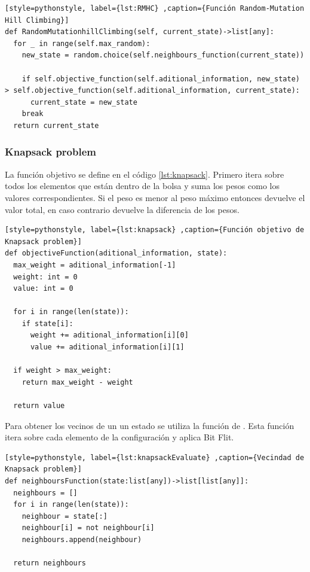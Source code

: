 \documentclass[12pt,twoside]{article}
\begin{document}
\begin{lstlisting}[style=pythonstyle, label={lst:RMHC} ,caption={Función Random-Mutation Hill Climbing}]
def RandomMutationhillClimbing(self, current_state)->list[any]:       
  for _ in range(self.max_random):
    new_state = random.choice(self.neighbours_function(current_state))

    if self.objective_function(self.aditional_information, new_state) > self.objective_function(self.aditional_information, current_state):
      current_state = new_state
    break
  return current_state
\end{lstlisting}

\clearpage
\subsubsection{Knapsack problem}

La función objetivo se define en el código \ref{lst:knapsack}. Primero itera sobre todos los elementos que están dentro de la bolsa y suma los pesos como los valores correspondientes. Si el peso es menor al peso máximo entonces devuelve el valor total, en caso contrario devuelve la diferencia de los pesos.

\begin{lstlisting}[style=pythonstyle, label={lst:knapsack} ,caption={Función objetivo de Knapsack problem}]
def objectiveFunction(aditional_information, state):
  max_weight = aditional_information[-1]
  weight: int = 0
  value: int = 0

  for i in range(len(state)):
    if state[i]:
      weight += aditional_information[i][0]
      value += aditional_information[i][1]

  if weight > max_weight:
    return max_weight - weight
    
  return value
\end{lstlisting}

Para obtener los vecinos de un un estado se utiliza la función de \cite{lst:knapsackEvaluate}. Esta función itera sobre cada elemento de la configuración y aplica Bit Flit.

\begin{lstlisting}[style=pythonstyle, label={lst:knapsackEvaluate} ,caption={Vecindad de Knapsack problem}]
def neighboursFunction(state:list[any])->list[list[any]]:
  neighbours = []
  for i in range(len(state)):
    neighbour = state[:]
    neighbour[i] = not neighbour[i]
    neighbours.append(neighbour)

  return neighbours
\end{lstlisting}
\end{document}
